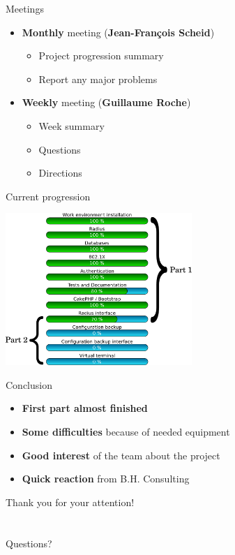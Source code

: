 \documentclass[12pt]{beamer}
\begin{document}
\begin{frame}{Meetings}
\begin{itemize}
    \item \textbf{Monthly} meeting (\textbf{Jean-François Scheid})
	\vspace{0.2cm}
	\begin{itemize}
	\item Project progression summary
	\item Report any major problems
	\end{itemize}
	\vspace{0.8cm}\pause
    \item \textbf{Weekly} meeting (\textbf{Guillaume Roche})
	\vspace{0.2cm}
	\begin{itemize}
	\item Week summary
	\item Questions
	\item Directions
	\end{itemize}
    \end{itemize}
\end{frame}

\begin{frame}{Current progression}
    \begin{center}
         \includegraphics[width=200pt]{img/progress.pdf}
    \end{center}
\end{frame}

\begin{frame}{Conclusion}
    \begin{itemize}
	\item \textbf{First part almost finished}
	\vfill
	\item \textbf{Some difficulties} because of needed equipment
	\vfill
	\item \textbf{Good interest} of the team about the project
	\vfill
	\item \textbf{Quick reaction} from B.H. Consulting
    \end{itemize}
\end{frame}

\begin{frame}{}
    \begin{center}
	{\huge{Thank you for your attention!\\~\\~\\}}
	{\huge{Questions?}}
    \end{center}
\end{frame}
\end{document}

